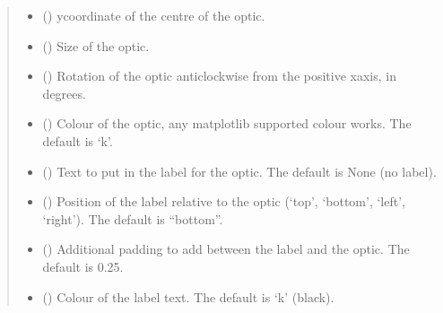 \documentclass[letterpaper,10pt,english]{sphinxmanual}
\begin{document}
\begin{fulllineitems}
\begin{fulllineitems}
\begin{quote}
\begin{description}
\begin{itemize}
\item {} 
\sphinxAtStartPar
{} () \textendash{} y\sphinxhyphen{}coordinate of the centre of the optic.

\item {} 
\sphinxAtStartPar
{} () \textendash{} Size of the optic.

\item {} 
\sphinxAtStartPar
{} () \textendash{} Rotation of the optic anticlockwise from the positive x\sphinxhyphen{}axis, in degrees.

\item {} 
\sphinxAtStartPar
{} (\sphinxstyleliteralemphasis{\sphinxupquote{, }}) \textendash{} Colour of the optic, any matplotlib supported colour works. The default is ‘k’.

\item {} 
\sphinxAtStartPar
{} (\sphinxstyleliteralemphasis{\sphinxupquote{, }}) \textendash{} Text to put in the label for the optic. The default is None (no label).

\item {} 
\sphinxAtStartPar
{} (\sphinxstyleliteralemphasis{\sphinxupquote{, }}) \textendash{} Position of the label relative to the optic (‘top’, ‘bottom’, ‘left’, ‘right’).
The default is “bottom”.

\item {} 
\sphinxAtStartPar
{} (\sphinxstyleliteralemphasis{\sphinxupquote{, }}) \textendash{} Additional padding to add between the label and the optic. The default is 0.25.

\item {} 
\sphinxAtStartPar
{} (\sphinxstyleliteralemphasis{\sphinxupquote{, }}) \textendash{} Colour of the label text. The default is ‘k’ (black).


\end{itemize}
\end{description}
\end{quote}
\end{fulllineitems}
\end{fulllineitems}
\end{document}
